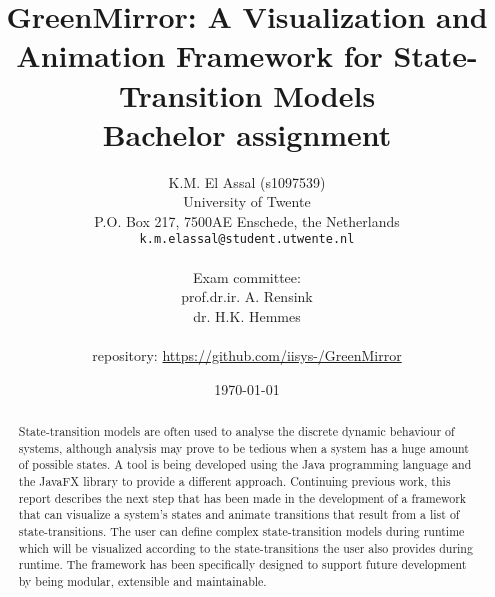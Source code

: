 \documentclass[a4paper]{article}
\title{GreenMirror: A Visualization and Animation Framework for State-Transition Models \\ {\large Bachelor assignment}}
\author{
	K.M. El Assal (s1097539) \\ 
	University of Twente \\ 
	P.O. Box 217, 7500AE Enschede, the Netherlands \\ 
	\texttt{k.m.elassal@student.utwente.nl} \\
	\\ 
	Exam committee: \\ 
	prof.dr.ir. A. Rensink \\ 
	dr. H.K. Hemmes \\
	\\
	repository: \url{https://github.com/iisys-/GreenMirror}
}
\date{\today}
\begin{document}
\maketitle
\begin{abstract}
State-transition models are often used to analyse the discrete dynamic behaviour of systems, although analysis may prove to be tedious when a system has a huge amount of possible states. A tool is being developed using the Java programming language and the JavaFX library to provide a different approach. Continuing previous work, this report describes the next step that has been made in the development of a framework that can visualize a system's states and animate transitions that result from a list of state-transitions. The user can define complex state-transition models during runtime which will be visualized according to the state-transitions the user also provides during runtime. The framework has been specifically designed to support future development by being modular, extensible and maintainable.
\end{abstract}

\newpage
\tableofcontents

\newpage

\newpage

\newpage

\newpage

\newpage

\newpage




\newpage
\appendix

\newpage

\end{document}

